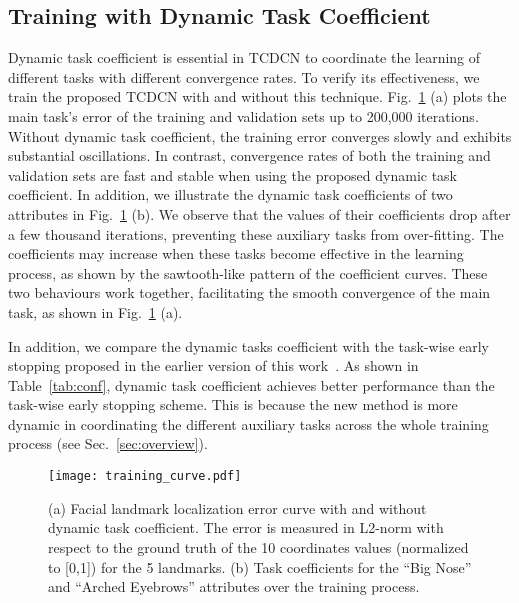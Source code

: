 \documentclass[10pt,journal,compsoc]{IEEEtran}
\begin{document}
\subsection{Training with Dynamic Task Coefficient}
\label{sec:exp_dynamic_task}
Dynamic task coefficient is essential in TCDCN to coordinate the learning of different tasks with different convergence rates.
To verify its effectiveness, we train the proposed TCDCN with and without this technique. Fig.~\ref{fig:training_curve} (a) plots the main task's error of the training and validation sets up to 200,000 iterations. Without dynamic task coefficient, the training error converges slowly and exhibits substantial oscillations. In contrast, convergence rates of both the training and validation sets are fast and stable when using the proposed dynamic task coefficient. In addition, we illustrate the dynamic task coefficients of two attributes in Fig.~\ref{fig:training_curve} (b). We observe that the values of their coefficients drop after a few thousand iterations, preventing these auxiliary tasks from over-fitting. The coefficients may increase when these tasks become effective in the learning process, as shown by the sawtooth-like pattern of the coefficient curves. These two behaviours work together, facilitating the smooth convergence of the main task, as shown in Fig.~\ref{fig:training_curve} (a).

In addition, we compare the dynamic tasks coefficient with the task-wise early stopping proposed in the earlier version of this work~\cite{zhang2014facial}.
As shown in Table~\ref{tab:conf}, dynamic task coefficient achieves better performance than the task-wise early stopping scheme. This is because the new method is more dynamic in coordinating the different auxiliary tasks across the whole training process (see Sec.~\ref{sec:overview}).


\begin{figure}[t]
  \centering
  \texttt{[image: training\_curve.pdf]}
  \vskip -0.3cm
  \caption{(a) Facial landmark localization error curve with and without dynamic task coefficient.  The error is measured in L2-norm with respect to the ground truth of the 10 coordinates values (normalized to [0,1]) for the 5 landmarks. (b) Task coefficients for the ``Big Nose'' and ``Arched Eyebrows'' attributes over the training process.}
  \label{fig:training_curve}
  \vskip -0.25cm
\end{figure}
\end{document}
